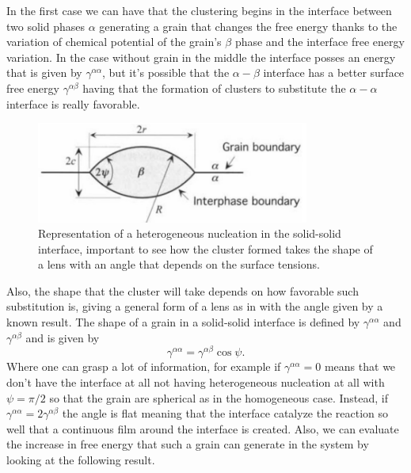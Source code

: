 In the first case we can have that the clustering begins in the interface between two solid phases $\alpha$ generating a grain that changes the free energy thanks to the variation of chemical potential of the grain's $\beta$ phase and the interface free energy variation. In the case without grain in the middle the interface posses an energy that is given by $\gamma^{\alpha\alpha}$, but it's possible that the $\alpha-\beta$ interface has a better surface free energy $\gamma^{\alpha\beta}$ having that the formation of clusters to substitute the $\alpha-\alpha$ interface is really favorable.
\begin{figure}[b]
    \centering
    \includegraphics[width=0.8\textwidth]{Immagini/SolidSolidInter.png}
    \caption{
        Representation of a heterogeneous nucleation in the solid-solid interface, important to see how the cluster formed takes the shape of a lens with an angle that depends on the surface tensions.
    }
    \label{fig:SolidSolidInter}
\end{figure}
Also, the shape that the cluster will take depends on how favorable such substitution is, giving a general form of a lens as in  with the angle given by a known result.
\newpage
{}
{
    The shape of a grain in a solid-solid interface is defined by $\gamma^{\alpha\alpha}$ and $\gamma^{\alpha\beta}$ and is given by
    \begin{equation}
        \label{eq:YoungEqua}
        \gamma^{\alpha\alpha} = \gamma^{\alpha\beta}\cos\psi.
    \end{equation}
}
\noindent
Where one can grasp a lot of information, for example if $\gamma^{\alpha\alpha} = 0$ means that we don't have the interface at all not having heterogeneous nucleation at all with $\psi = \pi/2$ so that the grain are spherical as in the homogeneous case. Instead, if $\gamma^{\alpha\alpha} = 2\gamma^{\alpha\beta}$ the angle is flat meaning that the interface catalyze the reaction so well that a continuous film around the interface is created. Also, we can evaluate the increase in free energy that such a grain can generate in the system by looking at the following result.

